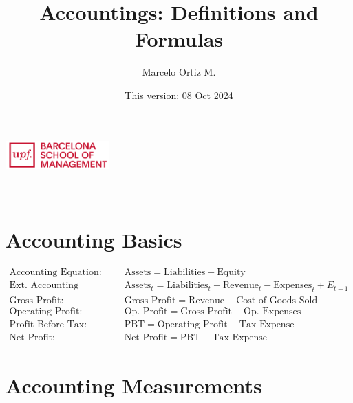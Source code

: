 \documentclass[12pt]{article}
\title{Accountings: Definitions and  Formulas}
\author{Marcelo Ortiz M.}
\date{This version: 08 Oct 2024}
\begin{document}
\makeatletter  
\begin{center}
	\includegraphics[width=0.3\textwidth]{logo.png}\\[1em]  %
	{\LARGE \textbf{\@title}}\\[1em]  %
	{\large \@author}\\[1em]  %
	{\@date}  %
\end{center}
\makeatother  %

\section{Accounting Basics}
	\begin{tcolorbox}
	\begin{align*}
		\text{Accounting Equation:} \quad & \text{Assets} = \text{Liabilities} + \text{Equity} \\
		\text{Ext. Accounting Equation:} \quad & \text{Assets}_{t} = \text{Liabilities}_{t} + \text{Revenue}_{t}- \text{Expenses}_t+E_{t-1} \\
		\text{Gross Profit:} \quad & \text{Gross Profit} = \text{Revenue} - \text{Cost of Goods Sold} \\
		\text{Operating Profit:} \quad & \text{Op. Profit} = \text{Gross Profit} - \text{Op. Expenses} \\
		\text{Profit Before Tax:} \quad & \text{PBT} = \text{Operating Profit} - \text{Tax Expense} \\
		\text{Net Profit:} \quad & \text{Net Profit} = \text{PBT} - \text{Tax Expense}
	\end{align*}
	\end{tcolorbox}

\section{Accounting Measurements}
\end{document}
